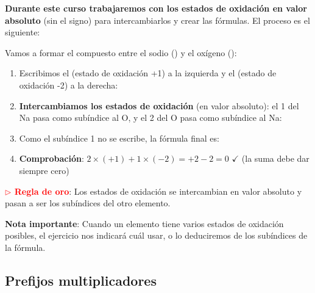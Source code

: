 \textbf{Durante este curso trabajaremos con los estados de oxidación en valor absoluto} (sin el signo) para intercambiarlos y crear las fórmulas. El proceso es el siguiente:

\begin{example}
    Vamos a formar el compuesto entre el sodio () y el oxígeno ():

    \begin{enumerate}[label=\letraminuscula]
            \item Escribimos el  (estado de oxidación +1) a la izquierda y el  (estado de oxidación -2) a la derecha:

             

            \item \textbf{Intercambiamos los estados de oxidación} (en valor absoluto): el 1 del Na pasa como subíndice al O, y el 2 del O pasa como subíndice al Na:


            \item Como el subíndice 1 no se escribe, la fórmula final es: 

            \item \textbf{Comprobación}: $2 \times (+1) + 1 \times (-2) = +2 - 2 = 0$ $\checkmark$ (la suma debe dar siempre cero)
    \end{enumerate}
\end{example}

\begin{remark}
    \textbf{\textcolor{red}{$\triangleright$ Regla de oro}}: Los estados de oxidación se intercambian en valor absoluto y pasan a ser los subíndices del otro elemento.
\end{remark}



\textbf{Nota importante}: Cuando un elemento tiene varios estados de oxidación posibles, el ejercicio nos indicará cuál usar, o lo deduciremos de los subíndices de la fórmula.

\subsection{Prefijos multiplicadores}

